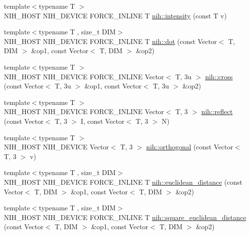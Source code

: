 \begin{DoxyCompactItemize}
\item 
{\footnotesize template$<$typename T $>$ }\\\-N\-I\-H\-\_\-\-H\-O\-S\-T \-N\-I\-H\-\_\-\-D\-E\-V\-I\-C\-E \-F\-O\-R\-C\-E\-\_\-\-I\-N\-L\-I\-N\-E \-T \hyperlink{group__vectors_ga5aba2566a39c58297e8f97bcf771519f}{nih\-::intensity} (const \-T v)
\item 
{\footnotesize template$<$typename T , size\-\_\-t \-D\-I\-M$>$ }\\\-N\-I\-H\-\_\-\-H\-O\-S\-T \-N\-I\-H\-\_\-\-D\-E\-V\-I\-C\-E \-F\-O\-R\-C\-E\-\_\-\-I\-N\-L\-I\-N\-E \-T \hyperlink{group__vectors_ga299bb7e770db20680a383864db4bd843}{nih\-::dot} (const \-Vector$<$ \-T, \-D\-I\-M $>$ \&op1, const \-Vector$<$ \-T, \-D\-I\-M $>$ \&op2)
\item 
{\footnotesize template$<$typename T $>$ }\\\-N\-I\-H\-\_\-\-H\-O\-S\-T \-N\-I\-H\-\_\-\-D\-E\-V\-I\-C\-E \*
\-F\-O\-R\-C\-E\-\_\-\-I\-N\-L\-I\-N\-E \-Vector$<$ \-T, 3u $>$ \hyperlink{group__vectors_ga14de1c4465c863797732d372f933a932}{nih\-::cross} (const \-Vector$<$ \-T, 3u $>$ \&op1, const Vector$<$ T, 3u $>$ \&op2)
\item 
{\footnotesize template$<$typename T $>$ }\\\-N\-I\-H\-\_\-\-H\-O\-S\-T \-N\-I\-H\-\_\-\-D\-E\-V\-I\-C\-E \*
\-F\-O\-R\-C\-E\-\_\-\-I\-N\-L\-I\-N\-E \-Vector$<$ \-T, 3 $>$ \hyperlink{group__vectors_ga45b100c1ab0f691ea58662e70c0801c3}{nih\-::reflect} (const \-Vector$<$ \-T, 3 $>$ \-I, const \-Vector$<$ \-T, 3 $>$ \-N)
\item 
{\footnotesize template$<$typename T $>$ }\\\-N\-I\-H\-\_\-\-H\-O\-S\-T \-N\-I\-H\-\_\-\-D\-E\-V\-I\-C\-E \-Vector$<$ \-T, 3 $>$ \hyperlink{group__vectors_gac2324a31b7a178eaea07e98f0b13f292}{nih\-::orthogonal} (const \-Vector$<$ \-T, 3 $>$ v)
\item 
{\footnotesize template$<$typename T , size\-\_\-t \-D\-I\-M$>$ }\\\-N\-I\-H\-\_\-\-H\-O\-S\-T \-N\-I\-H\-\_\-\-D\-E\-V\-I\-C\-E \-F\-O\-R\-C\-E\-\_\-\-I\-N\-L\-I\-N\-E \-T \hyperlink{group__vectors_gad840e1ac601434335deb2ac40bdf71dc}{nih\-::euclidean\-\_\-distance} (const \-Vector$<$ \-T, \-D\-I\-M $>$ \&op1, const \-Vector$<$ \-T, \-D\-I\-M $>$ \&op2)
\item 
{\footnotesize template$<$typename T , size\-\_\-t \-D\-I\-M$>$ }\\\-N\-I\-H\-\_\-\-H\-O\-S\-T \-N\-I\-H\-\_\-\-D\-E\-V\-I\-C\-E \-F\-O\-R\-C\-E\-\_\-\-I\-N\-L\-I\-N\-E \-T \hyperlink{group__vectors_ga21d1cd79e48416f289f7b0e55f3b32dc}{nih\-::square\-\_\-euclidean\-\_\-distance} (const \-Vector$<$ \-T, \-D\-I\-M $>$ \&op1, const \-Vector$<$ \-T, \-D\-I\-M $>$ \&op2)

\end{DoxyCompactItemize}
